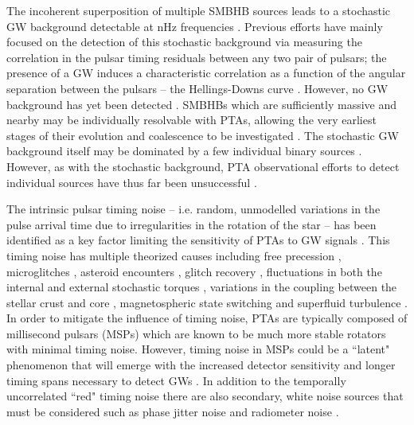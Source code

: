 \documentclass[fleqn,usenatbib,useAMS]{mnras}
\begin{document}
The incoherent superposition of multiple SMBHB sources leads to a stochastic GW background detectable at nHz frequencies \citep{Allen1997,Sesana10,Christensen2019,Renzini2022}. Previous efforts have mainly focused on the detection of this stochastic background via measuring the correlation in the pulsar timing residuals between any two pair of pulsars; the presence of a GW induces a characteristic correlation as a function of the angular separation between the pulsars -- the Hellings-Downs curve \citep{Hellings}. However, no GW background has yet been detected \citep{Lentati2015,NanoGrav2018,2022MNRAS.510.4873A}. SMBHBs which are sufficiently massive and nearby may be individually resolvable with PTAs, allowing the very earliest stages of their evolution and coalescence to be investigated \citep{Sesana2010,Zhu10,Babak2012,2013CQGra..30v4004E,Zhupulsarterms}. 
The stochastic GW background itself may be dominated by a few individual binary sources \citep{Ravi2012singlesource}. However, as with the stochastic background, PTA observational efforts to detect individual sources have thus far been unsuccessful \citep{Zhu2014PPTA,Babak2016,Arzoumanian2023}. \newline 




The intrinsic pulsar timing noise -- i.e.  random, unmodelled variations in the pulse arrival time due to irregularities in the rotation of the star -- has been identified as a key factor limiting the sensitivity of PTAs to GW signals \citep{Shannon2010,Lasky2015,Caballero2016}. This timing noise has multiple theorized causes including free precession \citep{free_precession_kerr,stairs_freeprecession}, microglitches \citep{Alessandro1995,Melatos2008,Espinoza2021}, asteroid encounters \citep{Shannon_2013,Brook_2014}, glitch recovery \citep{Johnston10,Hobbs2010glitch}, fluctuations in both the internal and external stochastic torques \citep{Cordes1981, 2006MNRAS.370L..76U,Antonelli2023}, variations in the coupling between the stellar crust and core \citep{Jones1990MNRAS.246..364J}, magnetospheric state switching \citep{magneto1,Lyne2010L} and superfluid turbulence \citep{Link10.111,Melatos2014}. In order to mitigate the influence of timing noise, PTAs are typically composed of millisecond pulsars (MSPs) which are known to be much more stable rotators with minimal timing noise. However, timing noise in MSPs could be a ``latent" phenomenon that will emerge with the increased detector sensitivity and longer timing spans necessary to detect GWs \citep{Shannon2010}. In addition to the temporally uncorrelated ``red" timing noise there are also secondary, white noise sources that must be considered such as phase jitter noise and radiometer noise \citep{Cordes2010,Lam2019,Parthasarathy2021}. \newline 
\end{document}
